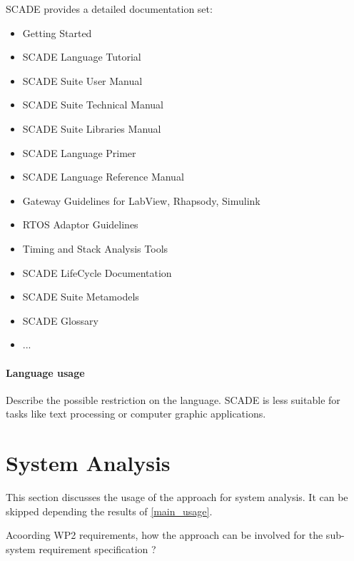 SCADE provides a detailed documentation set:

\begin{itemize}
	\item Getting Started
	\item SCADE Language Tutorial
	\item SCADE Suite User Manual
	\item SCADE Suite Technical Manual
	\item SCADE Suite Libraries Manual
	\item SCADE Language Primer
	\item SCADE Language Reference Manual
	\item Gateway Guidelines for LabView, Rhapsody, Simulink
	\item RTOS Adaptor Guidelines
	\item Timing and Stack Analysis Tools
	\item SCADE LifeCycle Documentation
	\item SCADE Suite Metamodels
	\item SCADE Glossary
	\item ...
\end{itemize}


\paragraph{Language usage} Describe the possible restriction on the language. 
SCADE is less suitable for tasks like text processing or computer graphic applications.


\section{System Analysis}
This section discusses the usage of the approach for system analysis.
It can be skipped depending the results of \ref{main_usage}.

Acoording WP2 requirements, how the approach can be involved for the sub-system requirement specification ?

